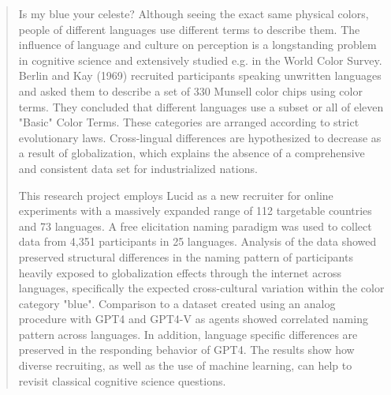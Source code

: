 \documentclass[
12pt, %
english, %
onehalfspacing, %
nolistspacing, %
liststotoc, %
parskip, %
headsepline, %
chapterinoneline, %
]{MastersDoctoralThesis} %
\begin{document}
\begin{abstract}
\addchaptertocentry{\abstractname} %
Is my blue your celeste? 
Although seeing the exact same physical colors, people of different languages use different terms to describe them. The influence of language and culture on perception is a longstanding problem in cognitive science and extensively studied e.g. in the World Color Survey. Berlin and Kay (1969) recruited participants speaking unwritten languages and asked them to describe a set of 330 Munsell color chips using color terms. They concluded that different languages use a subset or all of eleven "Basic" Color Terms. These categories are arranged according to strict evolutionary laws. Cross-lingual differences are hypothesized to decrease as a result of globalization, which explains the absence of a comprehensive and consistent data set for industrialized nations.

This research project employs Lucid as a new recruiter for online experiments with a massively expanded range of 112 targetable countries and 73 languages. A free elicitation naming paradigm was used to collect data from 4,351 participants in 25 languages. Analysis of the data showed preserved structural differences in the naming pattern of participants heavily exposed to globalization effects through the internet across languages, specifically the expected cross-cultural variation within the color category "blue".
Comparison to a dataset created using an analog procedure with GPT4 and GPT4-V as agents showed correlated naming pattern across languages. In addition, language specific differences are preserved in the responding behavior of GPT4. %
The results show how diverse recruiting, as well as the use of machine learning, can help to revisit classical cognitive science questions.



\end{abstract}

\end{document}
